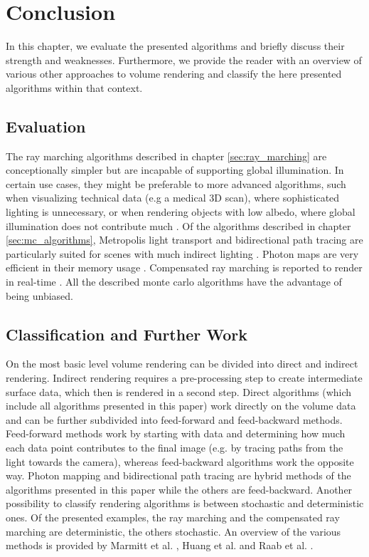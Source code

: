 \section{Conclusion}
\label{sec:conclusion}
In this chapter, we evaluate the presented algorithms and briefly discuss their strength and weaknesses. Furthermore, we provide the reader with an overview of various other approaches to volume rendering and classify the here presented algorithms within that context.
\subsection{Evaluation}
The ray marching algorithms described in chapter \ref{sec:ray_marching} are conceptionally simpler but are incapable of supporting global illumination. In certain use cases, they might be preferable to more advanced algorithms, such when visualizing technical data (e.g a medical 3D scan), where sophisticated lighting is unnecessary, or when rendering objects with low albedo, where global illumination does not contribute much \cite{10.1145/964965.808594}. Of the algorithms described in chapter \ref{sec:mc_algorithms}, Metropolis light transport and bidirectional path tracing are particularly suited for scenes with much indirect lighting \cite{metropolis, bidirectional-ray-tracing}. Photon maps are very efficient in their memory usage \cite{10.1145/280814.280925}. Compensated ray marching is reported to render in real-time \cite{zhou2007real-time}. All the described monte carlo algorithms have the advantage of being unbiased.
\subsection{Classification and Further Work}
On the most basic level volume rendering can be divided into direct and indirect rendering\cite{Westover1991SplattingAP, 4384237}. Indirect rendering requires a pre-processing step to create intermediate surface data, which then is rendered in a second step.
Direct algorithms (which include all algorithms presented in this paper) work directly on the volume data and can be further subdivided into feed-forward and feed-backward methods. Feed-forward methods work by starting with data and determining how much each data point contributes to the final image \cite{10.5555/94788} (e.g. by tracing paths from the light towards the camera), whereas feed-backward algorithms work the opposite way. Photon mapping and bidirectional path tracing are hybrid methods of the algorithms presented in this paper while the others are feed-backward.
Another possibility to classify rendering algorithms is between stochastic and deterministic ones. Of the presented examples, the ray marching and the compensated ray marching are deterministic, the others stochastic. 
An overview of the various methods is provided by Marmitt et al. \cite{Marmitt2006InteractiveVR}, Huang et al. \cite{4384237} and Raab et al. \cite{10.1007/978-3-540-74496-2_35}.




